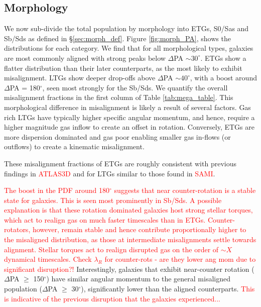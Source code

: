 \documentclass[fleqn,usenatbib]{mnras}
\newcommand{\red}[1]{{\textcolor{red}{#1}}}
\begin{document}
\subsection{Morphology}
We now sub-divide the total population by morphology into ETGs, S0/Sas and Sb/Sds as defined in \S\ref{sec:morph_def}. Figure \ref{fig:morph_PA}, shows the distributions for each category. We find that for all morphological types, galaxies are most commonly aligned with strong peaks below $\Delta$PA $\sim 30^{\circ}$. ETGs show a flatter distribution than their later counterparts, as the most likely to exhibit misalignment. LTGs show deeper drop-offs above $\Delta$PA $\sim 40^{\circ}$, with a boost around $\Delta$PA = 180$^{\circ}$, seen most strongly for the Sb/Sds. We quantify the overall misalignment fractions in the first column of Table \ref{tab:mega_table}. This morphological difference in misalignment is likely a result of several factors. Gas rich LTGs have typically higher specific angular momentum, and hence, require a higher magnitude gas inflow to create an offset in rotation. Conversely, ETGs are more dispersion dominated and gas poor enabling smaller gas in-flows (or outflows) to create a kinematic misalignment. 

These misalignment fractions of ETGs are roughly consistent with previous findings in \red{ATLAS3D} and for LTGs similar to those found in \red{SAMI}. 

\red{The boost in the PDF around 180$^{\circ}$ suggests that near counter-rotation is a stable state for galaxies. This is seen most prominently in Sb/Sds. A possible explanation is that these rotation dominated galaxies host strong stellar torques, which act to realign gas on much faster timescales than in ETGs. Counter-rotators, however, remain stable and hence contribute proportionally higher to the misaligned distribution, as those at intermediate misalignments settle towards alignment. Stellar torques act to realign disrupted gas on the order of $\sim X$ dynamical timescales. Check $\lambda_{R}$ for counter-rots - are they lower ang mom due to significant disruption?!} Interestingly, galaxies that exhibit near-counter rotation ($\Delta$PA $\geq$ 150$^{\circ}$) have similar angular momentum to the general misaligned population ($\Delta$PA $\geq$ 30$^{\circ}$), significantly lower than the aligned counterparts. \red{This is indicative of the previous disruption that the galaxies experienced...}
\end{document}
